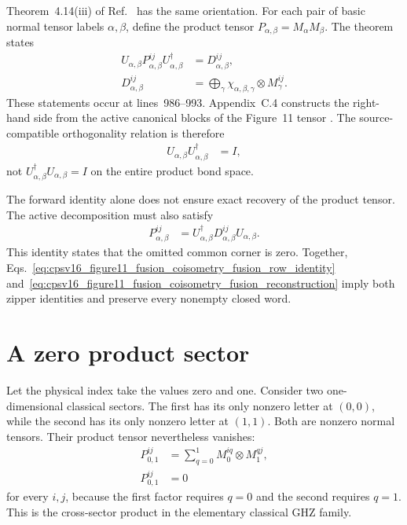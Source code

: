 \documentclass{article}
\begin{document}
Theorem~4.14(iii) of Ref.~\cite{Cirac2016MPDO_arXiv} has the same orientation.
For each pair of basic normal tensor labels $\alpha,\beta$, define the product
tensor $P_{\alpha,\beta}=M_\alpha M_\beta$. The theorem states
\begin{align}
    U_{\alpha,\beta}P_{\alpha,\beta}^{ij}
        U_{\alpha,\beta}^\dagger
        &= D_{\alpha,\beta}^{ij},
    \label{eq:cpsv16_figure11_fusion_coisometry_fusion_forward}\\
    D_{\alpha,\beta}^{ij}
        &= \bigoplus_\gamma
            \chi_{\alpha,\beta,\gamma}\otimes M_\gamma^{ij}.
    \label{eq:cpsv16_figure11_fusion_coisometry_active_direct_sum}
\end{align}
These statements occur at lines~986--993. Appendix~C.4 constructs the
right-hand side from the active canonical blocks of the Figure~11 tensor
\cite[lines~2020--2029]{Cirac2016MPDO_arXiv}. The source-compatible
orthogonality relation is therefore
\begin{align}
    U_{\alpha,\beta}U_{\alpha,\beta}^\dagger
        &= I,
    \label{eq:cpsv16_figure11_fusion_coisometry_fusion_row_identity}
\end{align}
not $U_{\alpha,\beta}^\dagger U_{\alpha,\beta}=I$ on the entire product bond
space.

The forward identity alone does not ensure exact recovery of the product
tensor. The active decomposition must also satisfy
\begin{align}
    P_{\alpha,\beta}^{ij}
        &= U_{\alpha,\beta}^\dagger
            D_{\alpha,\beta}^{ij}U_{\alpha,\beta}.
    \label{eq:cpsv16_figure11_fusion_coisometry_fusion_reconstruction}
\end{align}
This identity states that the omitted common corner is zero. Together,
Eqs.~\ref{eq:cpsv16_figure11_fusion_coisometry_fusion_row_identity}
and~\ref{eq:cpsv16_figure11_fusion_coisometry_fusion_reconstruction} imply
both zipper identities and preserve every nonempty closed word.

\section{A zero product sector}

Let the physical index take the values zero and one. Consider two
one-dimensional classical sectors. The first has its only nonzero letter at
$(0,0)$, while the second has its only nonzero letter at $(1,1)$. Both are
nonzero normal tensors. Their product tensor nevertheless vanishes:
\begin{align}
    P_{0,1}^{ij}
        &= \sum_{q=0}^{1}M_0^{iq}\otimes M_1^{qj},
    \label{eq:cpsv16_figure11_fusion_coisometry_cross_product_sum}\\
    P_{0,1}^{ij}
        &= 0
    \label{eq:cpsv16_figure11_fusion_coisometry_zero_cross_product}
\end{align}
for every $i,j$, because the first factor requires $q=0$ and the second
requires $q=1$. This is the cross-sector product in the elementary classical
GHZ family.
\end{document}
